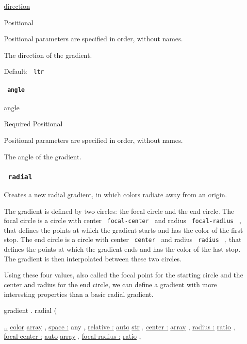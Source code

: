 \href{/docs/reference/layout/direction/}{direction}

{{ Positional }}

\label{definitions-linear-dir-positional-tooltip}
Positional parameters are specified in order, without names.

The direction of the gradient.

Default: \texttt{\ ltr\ }

\paragraph{\texorpdfstring{\texttt{\ angle\ }}{ angle }}\label{definitions-linear-angle}

\href{/docs/reference/layout/angle/}{angle}

{Required} {{ Positional }}

\label{definitions-linear-angle-positional-tooltip}
Positional parameters are specified in order, without names.

The angle of the gradient.

\subsubsection{\texorpdfstring{\texttt{\ radial\ }}{ radial }}\label{definitions-radial}

Creates a new radial gradient, in which colors radiate away from an
origin.

The gradient is defined by two circles: the focal circle and the end
circle. The focal circle is a circle with center
\texttt{\ focal-center\ } and radius \texttt{\ focal-radius\ } , that
defines the points at which the gradient starts and has the color of the
first stop. The end circle is a circle with center \texttt{\ center\ }
and radius \texttt{\ radius\ } , that defines the points at which the
gradient ends and has the color of the last stop. The gradient is then
interpolated between these two circles.

Using these four values, also called the focal point for the starting
circle and the center and radius for the end circle, we can define a
gradient with more interesting properties than a basic radial gradient.

gradient { . } { radial } (

{ \hyperref[definitions-radial-parameters-stops]{..}
\href{/docs/reference/visualize/color/}{color}
\href{/docs/reference/foundations/array/}{array} , } {
\hyperref[definitions-radial-parameters-space]{space :} { any } , } {
\hyperref[definitions-radial-parameters-relative]{relative :}
\href{/docs/reference/foundations/auto/}{auto}
\href{/docs/reference/foundations/str/}{str} , } {
\hyperref[definitions-radial-parameters-center]{center :}
\href{/docs/reference/foundations/array/}{array} , } {
\hyperref[definitions-radial-parameters-radius]{radius :}
\href{/docs/reference/layout/ratio/}{ratio} , } {
\hyperref[definitions-radial-parameters-focal-center]{focal-center :}
\href{/docs/reference/foundations/auto/}{auto}
\href{/docs/reference/foundations/array/}{array} , } {
\hyperref[definitions-radial-parameters-focal-radius]{focal-radius :}
\href{/docs/reference/layout/ratio/}{ratio} , }

